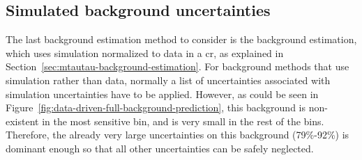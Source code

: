 \subsection{Simulated background uncertainties}
\label{simulated-background-uncertainties}

The last background estimation method to consider is the \tautau background estimation, which uses simulation normalized to data in a \gls{cr}, as explained in Section~\ref{sec:mtautau-background-estimation}. For background methods that use simulation rather than data, normally a list of uncertainties associated with simulation uncertainties have to be applied. However, as could be seen in Figure~\ref{fig:data-driven-full-background-prediction}, this background is non-existent in the most sensitive bin, and is very small in the rest of the bins. Therefore, the already very large uncertainties on this background (79\%-92\%) is dominant enough so that all other uncertainties can be safely neglected.

